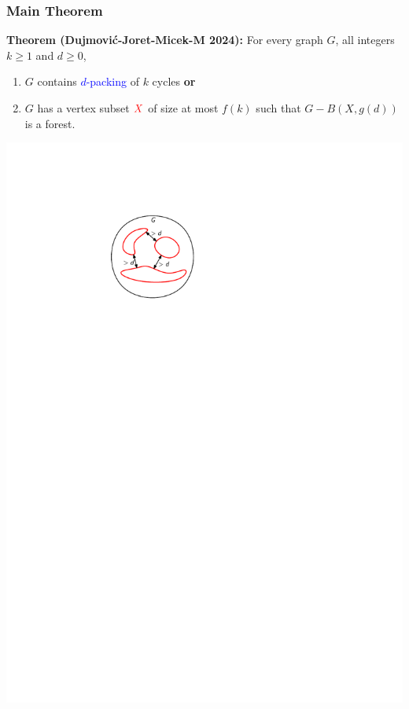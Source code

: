 \documentclass{beamer}
\begin{document}
\begin{frame}
  \frametitle{Main Theorem}

  \noindent\textbf{Theorem (Dujmović-Joret-Micek-M 2024):} For every graph $G$, all integers $k\ge 1$ and $d\ge 0$,
  \begin{enumerate}%
    \item $G$ contains \textcolor{blue}{$d$-packing} of $k$ cycles \textbf{or}
    \item $G$ has a vertex subset $\mathcolor{red}{X}$ of size at most $f(k)$ such that $G-B(X,g(d))$ is a forest.  \newline {}
  \end{enumerate}

  \begin{center}
    \includegraphics[scale=.9,page=1]{figs/cep}

\end{center}
\end{frame}
\end{document}
